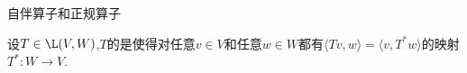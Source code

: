 \documentclass{ctexart}
\begin{document}
\pagestyle{empty}
\begin{center}\large 自伴算子和正规算子\end{center}
\begin{definition}[1.1 定义:伴随]
    设$T\in\L(V,W)$,$T$的是使得对任意$v\in V$和任意$w\in W$都有$\langle Tv,w\rangle=\langle v,T^*w\rangle$的映射$T^*:W\to V$.
\end{definition}
\end{document}
